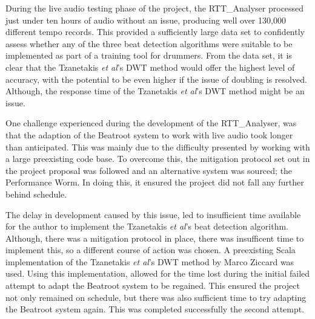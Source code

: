 \documentclass[a4paper, 11pt]{article}
\begin{document}
During the live audio testing phase of the project, the RTT\_Analyser processed just under ten hours of audio without an issue, producing well over 130,000 different tempo records. This provided a sufficiently large data set to confidently assess whether any of the three beat detection algorithms were suitable to be implemented as part of a training tool for drummers. From the data set, it is clear that the Tzanetakis \textit{et al}'s \cite{tzane1} DWT method would offer the highest level of accuracy, with the potential to be even higher if the issue of doubling is resolved. Although, the response time of the Tzanetakis \textit{et al}'s \cite{tzane1} DWT method might be an issue.\par 

One challenge experienced during the development of the RTT\_Analyser, was that the adaption of the Beatroot system to work with live audio took longer than anticipated. This was mainly due to the difficulty presented by working with a large preexisting code base. To overcome this, the mitigation protocol set out in the project proposal was followed and an alternative system was sourced; the Performance Worm. In doing this, it ensured the project did not fall any further behind schedule.\par 

The delay in development caused by this issue, led to insufficient time available for the author to implement the Tzanetakis \textit{et al}'s \cite{tzane1} beat detection algorithm. Although, there was a mitigation protocol in place, there was insufficent time to implement this, so a different course of action was chosen. A preexisting Scala implementation of the Tzanetakis \textit{et al}'s \cite{tzane1} DWT method by Marco Ziccard\cite{marcoZin} was used. Using this implementation, allowed for the time lost during the initial failed attempt to adapt the Beatroot system to be regained. This ensured the project not only remained on schedule, but there was also sufficient time to try adapting the Beatroot system again. This was completed successfully the second attempt.\par
\end{document}

